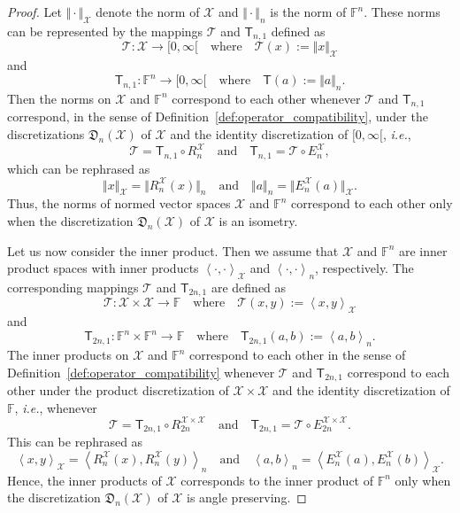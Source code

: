\documentclass[a4paper]{paper}
\newcommand{\Discr}{\mathfrak{D}}
\newcommand{\VecSpace}[1]{\mathscr{#1}}
\newcommand{\Field}{\mathbb{F}}
\newcommand{\Op}[1]{\mathcal{#1}}
\newcommand{\DiscOp}[1]{\mathsf{#1}}
\newcommand*{\EXT}[2]{\ensuremath{E_{#1}^{#2}}}
\newcommand*{\REST}[2]{\ensuremath{R_{#1}^{#2}}}
\newcommand*{\RnX}{\ensuremath{\REST{n}{\VecSpace{X}}}}
\newcommand*{\EnX}{\ensuremath{\EXT{n}{\VecSpace{X}}}}
\newcommand{\ip}[2]{\left \langle #1,#2 \right\rangle}
\newcommand{\ie}{\textsl{i.e.}\xspace}
\begin{document}
\begin{proof}
Let $\Vert \cdot \Vert_{\VecSpace{X}}$ denote the norm of $\VecSpace{X}$ and $\Vert \cdot \Vert_{n}$ is the 
norm of $\Field^{n}$. These norms can be represented by the mappings $\Op{T}$ and $\DiscOp{T}_{n,1}$ 
defined as  
\[ \Op{T} \colon \VecSpace{X}  \to [0,\infty[  \quad\text{where}\quad \Op{T}(x):=\Vert x \Vert_{\VecSpace{X}} \] 
and 
\[ \DiscOp{T}_{n,1} \colon \Field^{n} \to [0,\infty[  \quad\text{where}\quad \DiscOp{T}(a):=\Vert a \Vert_{n}. \] 
Then the norms on $\VecSpace{X}$ and $\Field^{n}$ 
correspond to each other whenever $\Op{T}$ and $\DiscOp{T}_{n,1}$ correspond,
in the sense of Definition~\ref{def:operator_compatibility},  under the discretizations $\Discr_{n}(\VecSpace{X})$ of $\VecSpace{X}$ 
and the identity discretization of  $[0,\infty[$, \ie,
\[  \Op{T} =  \DiscOp{T}_{n,1} \circ \RnX
   \quad\text{and}\quad 
   \DiscOp{T}_{n,1} =  \Op{T} \circ \EnX,
\]
which can be rephrased as
\[ \Vert x \Vert_{\VecSpace{X}} = \bigl\Vert \RnX(x) \bigr\Vert_{n}
    \quad \text{and}\quad
   \Vert a \Vert_{n} = \bigl\Vert \EnX(a) \bigr\Vert_{\VecSpace{X}}.
\]
Thus, the norms of normed vector spaces $\VecSpace{X}$ and $\Field^{n}$ correspond
to each other only when the discretization $\Discr_{n}(\VecSpace{X})$ of $\VecSpace{X}$ is an isometry. 

Let us now consider the inner product. Then we assume that $\VecSpace{X}$ and $\Field^{n}$ are inner 
product spaces with inner products $\ip{\cdot}{\cdot}_\VecSpace{X}$ and $\ip{\cdot}{\cdot}_{n}$, 
respectively. The corresponding mappings $\Op{T}$ and $\DiscOp{T}_{2n,1}$ are 
defined as  
\[ \Op{T} \colon \VecSpace{X} \times \VecSpace{X}  \to \Field  \quad\text{where}\quad \Op{T}(x,y):=\ip{x}{y}_{\VecSpace{X}} \] 
and 
\[ \DiscOp{T}_{2n,1} \colon \Field^{n} \times \Field^{n}  \to \Field  \quad\text{where}\quad \DiscOp{T}_{2n,1}(a,b):=\ip{a}{b}_{n}. \] 
The inner products on $\VecSpace{X}$ and $\Field^{n}$ 
correspond to each other in the sense of Definition~\ref{def:operator_compatibility} 
whenever $\Op{T}$ and $\DiscOp{T}_{2n,1}$ correspond to each other 
under the product discretization of $\VecSpace{X}\times \VecSpace{X}$ and the identity discretization of 
$\Field$, \ie, whenever 
\[ \Op{T} =  \DiscOp{T}_{2n,1} \circ R_{2n}^{\VecSpace{X}\times \VecSpace{X}} 
   \quad\text{and}\quad 
   \DiscOp{T}_{2n,1} =  \Op{T} \circ E_{2n}^{\VecSpace{X}\times \VecSpace{X}}.
\]
This can be rephrased as
\[ \ip{x}{y}_{\VecSpace{X}} =  \ip{\RnX(x)}{\RnX(y)}_{n}
    \quad\text{and}\quad 
   \ip{a}{b}_{n} = \ip{\EnX(a)}{\EnX(b)}_{\VecSpace{X}}.
\]
Hence, the inner products of $\VecSpace{X}$ corresponds to the inner product of $\Field^{n}$ 
only when the discretization $\Discr_{n}(\VecSpace{X})$ of $\VecSpace{X}$ is angle preserving.
\end{proof}
\end{document}
